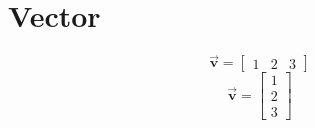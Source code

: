 \documentclass[12pt,a4paper]{article}
\begin{document}
\section{Vector}
\begin{equation*}
    \vec{\mathbf{v}} = \begin{bmatrix} 1&2&3    \end{bmatrix}
\end{equation*}
\begin{equation*}
    \vec{\bm{v}} = \begin{bmatrix} 1 \\ 2 \\ 3 \end{bmatrix}
\end{equation*}
\end{document}
